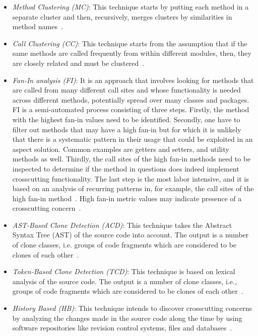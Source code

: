 \begin{itemize}
\item \textit{Method Clustering (MC)}: This technique starts by putting each method in a separate cluster and then, recursively, merges clusters by similarities in method names~\cite{Bernardi2009CTI}. 

\item \textit{Call Clustering (CC)}: This technique starts from the assumption that if the same methods are called frequently from within different modules, then, they are closely related and must be clustered~\cite{Danfeng}.


\item \textit{Fan-In analysis (FI)}: It is an approach that involves looking for methods that are called from many different call sites and whose functionality is needed across different methods, potentially spread over many classes and packages. 
FI is a semi-automated process consisting of three steps. Firstly, the method with the highest fan-in values need to be identified. Secondly, one have to filter out methods that may have a high fan-in but for which it is unlikely that there is a systematic pattern in their usage that could be exploited in an aspect solution. Common examples are getters and setters, and utility methods as well. Thirdly, the call sites of the high fan-in methods need to be inspected to determine if the method in questions does indeed implement crosscutting functionality. The last step is the most labor intensive, and it is based on an analysis of recurring patterns in, for example, the call sites of the high fan-in method~\cite{Marin:2007:ICC:1314493.1314496}.
High fan-in metric values may indicate presence of a crosscutting concern~\cite{Danfeng}.

\item \textit{AST-Based Clone Detection (ACD)}: This technique takes the Abstract Syntax Tree (AST) of the source code into account. The output is a number of clone classes, i.e. groups of code fragments which are considered to be clones of each other~\cite{Bruntink2005}.

\item \textit{Token-Based Clone Detection (TCD)}: This technique is based on lexical analysis of the source code. The output is a number of clone classes, i.e., groups of code fragments which are considered to be clones of each other~\cite{Bruntink2005}.

\item \textit{History Based (HB)}: This technique intends to discover crosscutting concerns by analyzing the changes made in the source code along the time by using software repositories like revision control systems, files and databases~\cite{Mulder:2010:ICC:1862372.1862381}.


\end{itemize}
